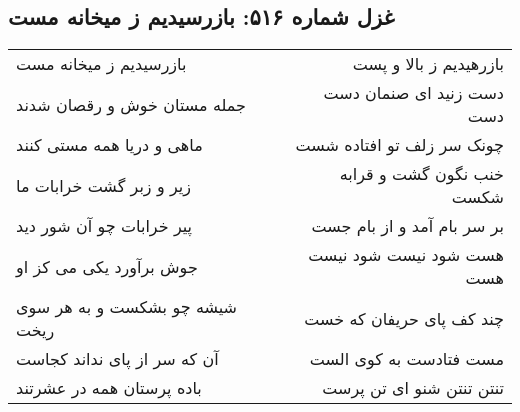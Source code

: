 \begin{center}
\section*{غزل شماره ۵۱۶: بازرسیدیم ز میخانه مست}
\label{sec:0516}
\begin{longtable}{l p{0.5cm} r}
بازرسیدیم ز میخانه مست
&&
بازرهیدیم ز بالا و پست
\\
جمله مستان خوش و رقصان شدند
&&
دست زنید ای صنمان دست دست
\\
ماهی و دریا همه مستی کنند
&&
چونک سر زلف تو افتاده شست
\\
زیر و زبر گشت خرابات ما
&&
خنب نگون گشت و قرابه شکست
\\
پیر خرابات چو آن شور دید
&&
بر سر بام آمد و از بام جست
\\
جوش برآورد یکی می کز او
&&
هست شود نیست شود نیست هست
\\
شیشه چو بشکست و به هر سوی ریخت
&&
چند کف پای حریفان که خست
\\
آن که سر از پای نداند کجاست
&&
مست فتادست به کوی الست
\\
باده پرستان همه در عشرتند
&&
تنتن تنتن شنو ای تن پرست
\\
\end{longtable}
\end{center}
